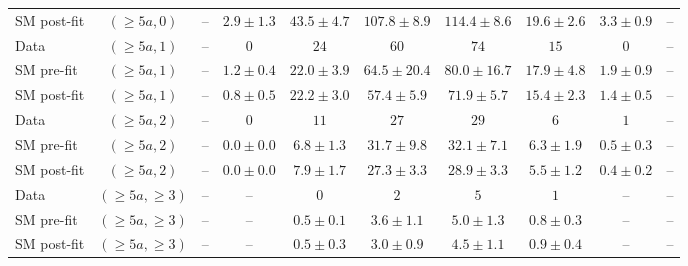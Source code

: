 \begin{table}[h!]
{\begin{tabular}{lccccccccc}
 SM post-fit & $(\geq 5a,0)$ & -- & $2.9\pm1.3$ & $43.5\pm4.7$ & $107.8\pm8.9$ & $114.4\pm8.6$ & $19.6\pm2.6$ & $3.3\pm0.9$ & -- \\[0.5ex]
 Data & $(\geq 5a,1)$ & -- & $0$ & $24$ & $60$ & $74$ & $15$ & $0$ & -- \\[0.5ex]
 SM pre-fit & $(\geq 5a,1)$ & -- & $1.2\pm0.4$ & $22.0\pm3.9$ & $64.5\pm20.4$ & $80.0\pm16.7$ & $17.9\pm4.8$ & $1.9\pm0.9$ & -- \\[0.5ex]
 SM post-fit & $(\geq 5a,1)$ & -- & $0.8\pm0.5$ & $22.2\pm3.0$ & $57.4\pm5.9$ & $71.9\pm5.7$ & $15.4\pm2.3$ & $1.4\pm0.5$ & -- \\[0.5ex]
 Data & $(\geq 5a,2)$ & -- & $0$ & $11$ & $27$ & $29$ & $6$ & $1$ & -- \\[0.5ex]
 SM pre-fit & $(\geq 5a,2)$ & -- & $0.0\pm0.0$ & $6.8\pm1.3$ & $31.7\pm9.8$ & $32.1\pm7.1$ & $6.3\pm1.9$ & $0.5\pm0.3$ & -- \\[0.5ex]
 SM post-fit & $(\geq 5a,2)$ & -- & $0.0\pm0.0$ & $7.9\pm1.7$ & $27.3\pm3.3$ & $28.9\pm3.3$ & $5.5\pm1.2$ & $0.4\pm0.2$ & -- \\[0.5ex]
 Data & $(\geq 5a,\geq 3)$ & -- & -- & $0$ & $2$ & $5$ & $1$ & -- & -- \\[0.5ex]
 SM pre-fit & $(\geq 5a,\geq 3)$ & -- & -- & $0.5\pm0.1$ & $3.6\pm1.1$ & $5.0\pm1.3$ & $0.8\pm0.3$ & -- & -- \\[0.5ex]
 SM post-fit & $(\geq 5a,\geq 3)$ & -- & -- & $0.5\pm0.3$ & $3.0\pm0.9$ & $4.5\pm1.1$ & $0.9\pm0.4$ & -- & -- \\[0.5ex]



	\hline
	\hline
\end{tabular}}
\end{table}
